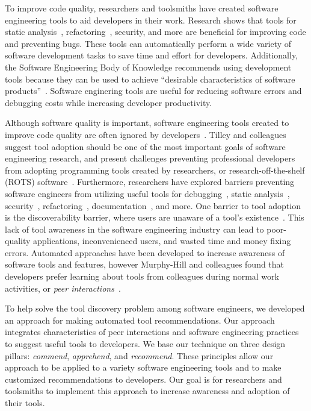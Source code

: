 \documentclass[sigconf,review,anonymous]{acmart}
\begin{document}
To improve code quality, researchers and toolsmiths have created software engineering tools to aid developers in their work. Research shows that tools for static analysis~\cite{UsingStaticAnalysis}, refactoring~\cite{Murphy-HillFitness}, security, and more are beneficial for improving code and preventing bugs. These tools can automatically perform a wide variety of software development tasks to save time and effort for developers. Additionally, the Software Engineering Body of Knowledge recommends using development tools because they can be used to achieve ``desirable characteristics of software products''~\cite{SWEBOK}. Software enginering tools are useful for reducing software errors and debugging costs while increasing developer productivity.

Although software quality is important, software engineering tools created to improve code quality are often ignored by developers~\cite{Ivanov2017Gaps}. Tilley and colleagues suggest tool adoption should be one of the most important goals of software engineering research, and present challenges preventing professional developers from adopting programming tools created by researchers, or research-off-the-shelf (ROTS) software~\cite{Tilley2003ROTS}. Furthermore, researchers have explored barriers preventing software engineers from utilizing useful tools for debugging~\cite{CaoDebugging}, static analysis~\cite{Johnson2013Why}, security~\cite{Xiao2014Security}, refactoring~\cite{MurpyHillBarriersRefactoring}, documentation~\cite{ForwardDocumentationRelevance}, and more. One barrier to tool adoption is the discoverability barrier, where users are unaware of a tool's existence~\cite{Murphy-HillScreencastingDiscovery}. This lack of tool awareness in the software engineering industry can lead to poor-quality applications, inconvenienced users, and wasted time and money fixing errors. Automated approaches have been developed to increase awareness of software tools and features, however Murphy-Hill and colleagues found that developers prefer learning about tools from colleagues during normal work activities, or \textit{peer interactions}~\cite{MurphyHill2011PeerInteraction}.

To help solve the tool discovery problem among software engineers, we developed an approach for making automated tool recommendations. Our approach integrates characteristics of peer interactions and software engineering practices to suggest useful tools to developers. We base our technique on three design pillars: \textit{commend}, \textit{apprehend}, and \textit{recommend}. These principles allow our approach to be applied to a variety software engineering tools and to make customized recommendations to developers. Our goal is for researchers and toolsmiths to implement this approach to increase awareness and adoption of their tools.
\end{document}
